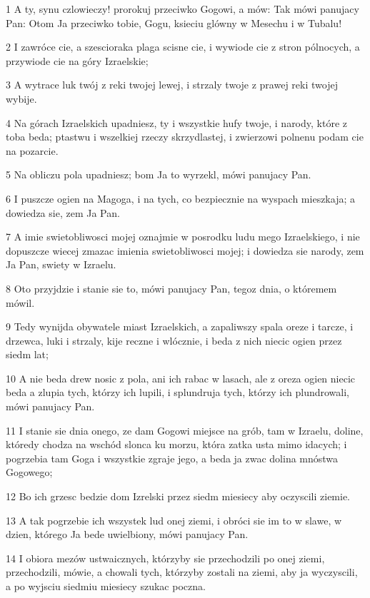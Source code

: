 \par 1 A ty, synu czlowieczy! prorokuj przeciwko Gogowi, a mów: Tak mówi panujacy Pan: Otom Ja przeciwko tobie, Gogu, ksieciu glówny w Mesechu i w Tubalu!
\par 2 I zawróce cie, a szescioraka plaga scisne cie, i wywiode cie z stron pólnocych, a przywiode cie na góry Izraelskie;
\par 3 A wytrace luk twój z reki twojej lewej, i strzaly twoje z prawej reki twojej wybije.
\par 4 Na górach Izraelskich upadniesz, ty i wszystkie hufy twoje, i narody, które z toba beda; ptastwu i wszelkiej rzeczy skrzydlastej, i zwierzowi polnenu podam cie na pozarcie.
\par 5 Na obliczu pola upadniesz; bom Ja to wyrzekl, mówi panujacy Pan.
\par 6 I puszcze ogien na Magoga, i na tych, co bezpiecznie na wyspach mieszkaja; a dowiedza sie, zem Ja Pan.
\par 7 A imie swietobliwosci mojej oznajmie w posrodku ludu mego Izraelskiego, i nie dopuszcze wiecej zmazac imienia swietobliwosci mojej; i dowiedza sie narody, zem Ja Pan, swiety w Izraelu.
\par 8 Oto przyjdzie i stanie sie to, mówi panujacy Pan, tegoz dnia, o któremem mówil.
\par 9 Tedy wynijda obywatele miast Izraelskich, a zapaliwszy spala oreze i tarcze, i drzewca, luki i strzaly, kije reczne i wlócznie, i beda z nich niecic ogien przez siedm lat;
\par 10 A nie beda drew nosic z pola, ani ich rabac w lasach, ale z oreza ogien niecic beda a zlupia tych, którzy ich lupili, i splundruja tych, którzy ich plundrowali, mówi panujacy Pan.
\par 11 I stanie sie dnia onego, ze dam Gogowi miejsce na grób, tam w Izraelu, doline, któredy chodza na wschód slonca ku morzu, która zatka usta mimo idacych; i pogrzebia tam Goga i wszystkie zgraje jego, a beda ja zwac dolina mnóstwa Gogowego;
\par 12 Bo ich grzesc bedzie dom Izrelski przez siedm miesiecy aby oczyscili ziemie.
\par 13 A tak pogrzebie ich wszystek lud onej ziemi, i obróci sie im to w slawe, w dzien, którego Ja bede uwielbiony, mówi panujacy Pan.
\par 14 I obiora mezów ustwaicznych, którzyby sie przechodzili po onej ziemi, przechodzili, mówie, a chowali tych, którzyby zostali na ziemi, aby ja wyczyscili, a po wyjsciu siedmiu miesiecy szukac poczna.
